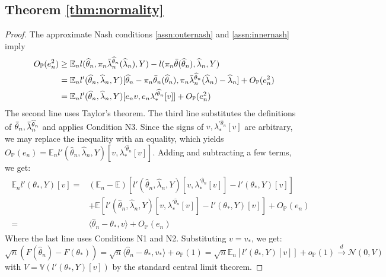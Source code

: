 \documentclass[12pt]{article}
\theoremstyle{myplain}
\theoremstyle{definition}
\theoremstyle{definition}
\theoremstyle{remark}
\numberwithin{equation}{section}
\begin{document}
\subsection{Theorem \ref{thm:normality}}
\begin{proof}
The approximate Nash conditions \ref{assn:outernash} and \ref{assn:innernash} imply
\begin{align}
    \begin{split}
        O_\mathbb{P}(e_n^2) & \geq \mathbb{E}_n l(\widehat{\theta}_n, \pi_n\Bar{\lambda}_n^{\widehat{\theta}_n}(\widehat{\lambda}_n), Y) - l(\pi_n \Bar{\theta}(\widehat{\theta}_n), \widehat{\lambda}_n, Y) \\
        & = \mathbb{E}_n l'(\widehat{\theta}_n, \widehat{\lambda}_n, Y)[\widehat{\theta}_n-\pi_n\Bar{\theta}_n(\widehat{\theta}_n), \pi_n\Bar{\lambda}_n^{\widehat{\theta}_n}(\widehat{\lambda}_n)-\widehat{\lambda}_n] + O_\mathbb{P}(e_n^2) \\
        & = \mathbb{E}_n l'(\widehat{\theta}_n, \widehat{\lambda}_n, Y)[e_n v, e_n \lambda_*^{\prime\widehat{\theta}_n}[v]] + O_\mathbb{P}(e_n^2)
    \end{split}
\end{align}
The second line uses Taylor's theorem. The third line substitutes the definitions of $\Bar\theta_n,\Bar\lambda_n^{\widehat\theta_n}$ and applies Condition N3. Since the signs of $v, \lambda_*^{\prime\widehat{\theta}_n}[v]$ are arbitrary, we may replace the inequality with an equality, which yields $O_\mathbb{P}(e_n) = \mathbb{E}_n l'(\widehat{\theta}_n, \widehat{\lambda}_n, Y)[v,\lambda_*^{\prime\widehat{\theta}_n}[v]]$. Adding and subtracting a few terms, we get:
\begin{align}
\begin{split}
    \mathbb{E}_n l'(\theta_*, Y)[v] = & (\mathbb{E}_n-\mathbb{E}) [l'(\widehat{\theta}_n,\widehat{\lambda}_n, Y)[v,\lambda_*^{\prime\widehat{\theta}_n}[v]]-l'(\theta_*, Y)[v]] \\
    & + \mathbb{E} [l'(\widehat{\theta}_n,\widehat{\lambda}_n, Y)[v,\lambda_*^{\prime\widehat{\theta}_n}[v]]-l'(\theta_*, Y)[v]] + O_\mathbb{P}(e_n) \\
    = & \langle \widehat{\theta}_n-\theta_*, v\rangle + O_\mathbb{P}(e_n)
\end{split}
\end{align}
Where the last line uses Conditions N1 and N2. Substituting $v=v_*$, we get:
\[\sqrt{n} \left( F(\widehat{\theta}_n)-F(\theta_*)\right) = \sqrt{n}\langle \widehat{\theta}_n-\theta_*, v_*\rangle +o_\mathbb{P}(1) = \sqrt{n}\mathbb{E}_n [l'(\theta_*, Y)[v]]+o_\mathbb{P}(1) \overset{d}{\longrightarrow} \mathcal{N}(0, V)\]
with $V=\mathbb{V}\left(l'(\theta_*, Y)[v]\right)$ by the standard central limit theorem.
\end{proof}
\end{document}
